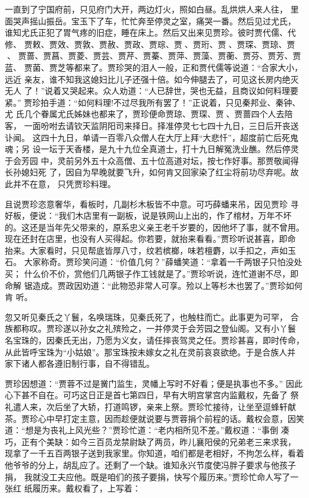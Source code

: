 一直到了宁国府前，只见府门大开，两边灯火，照如白昼。乱烘烘人来人往，
里面哭声摇山振岳。宝玉下了车，忙忙奔至停灵之室，痛哭一番。然后见过尤氏，
谁知尤氏正犯了胃气疼的旧症，睡在床上。然后又出来见贾珍。彼时贾代儒、代修、
贾敕、贾效、贾敦、贾赦、贾政、贾琮、贾、贾珩、贾、贾琛、贾琼、贾、
贾蔷、贾菖、贾菱、贾芸、贾芹、贾蓁、贾萍、贾藻、贾蘅、贾芬、贾芳、贾蓝、
贾菌、贾芝等都来了。贾珍哭的泪人一般，正和贾代儒等说道：“合家大小，远近
亲友，谁不知我这媳妇比儿子还强十倍。如今伸腿去了，可见这长房内绝灭无人
了！”说着又哭起来。众人劝道：“人已辞世，哭也无益，且商议如何料理要紧。”
贾珍拍手道：“如何料理!不过尽我所有罢了！”正说着，只见秦邦业、秦钟、尤
氏几个眷属尤氏姊妹也都来了，贾珍便命贾琼、贾琛、贾、贾蔷四个人去陪客，
一面吩咐去请钦天监阴阳司来择日。择准停灵七七四十九日，三日后开丧送讣闻。
这四十九日，单请一百零八众僧人在大厅上拜“大悲忏”，超度前亡后死鬼魂；另
设一坛于天香楼，是九十九位全真道士，打十九日解冤洗业醮。然后停灵于会芳园
中，灵前另外五十众高僧、五十位高道对坛，按七作好事。那贾敬闻得长孙媳妇死
了，因自为早晚就要飞升，如何肯又回家染了红尘将前功尽弃呢。故此并不在意，
只凭贾珍料理。

且说贾珍恣意奢华，看板时，几副杉木板皆不中意。可巧薛蟠来吊，因见贾珍
寻好板，便说：“我们木店里有一副板，说是铁网山上出的，作了棺材，万年不坏
的。这还是当年先父带来的，原系忠义亲王老千岁要的，因他坏了事，就不曾用。
现在还封在店里，也没有人买得起。你若要，就抬来看看。”贾珍听说甚喜，即命
抬来。大家看时，只见帮底皆厚八寸，纹若槟榔，味若檀麝，以手扣之，声如玉石。
大家称奇。贾珍笑问道：“价值几何？”薛蟠笑道：“拿着一千两银子只怕没处买；
什么价不价，赏他们几两银子作工钱就是了。”贾珍听说，连忙道谢不尽，即命解
锯造成。贾政因劝道：“此物恐非常人可享。殓以上等杉木也罢了。”贾珍如何肯
听。

忽又听见秦氏之丫鬟，名唤瑞珠，见秦氏死了，也触柱而亡。此事更为可罕，
合族都称叹。贾珍遂以孙女之礼殡殓之，一并停灵于会芳园之登仙阁。又有小丫鬟
名宝珠的，因秦氏无出，乃愿为义女，请任摔丧驾灵之任。贾珍甚喜，即时传命，
从此皆呼宝珠为“小姑娘”。那宝珠按未嫁女之礼在灵前哀哀欲绝。于是合族人并
家下诸人都各遵旧制行事，自不得错乱。

贾珍因想道：“贾蓉不过是黉门监生，灵幡上写时不好看；便是执事也不多。”
因此心下甚不自在。可巧这日正是首七第四日，早有大明宫掌宫内监戴权，先备了
祭礼遣人来，次后坐了大轿，打道鸣锣，亲来上祭。贾珍忙接待，让坐至逗蜂轩献
茶。贾珍心中早打定主意，因而趁便就说要与贾蓉捐个前程的话。戴权会意，因笑
道：“想是为丧礼上风光些？”贾珍忙道：“老内相所见不差。”戴权道：“事倒
凑巧，正有个美缺：如今三百员龙禁尉缺了两员，昨儿襄阳侯的兄弟老三来求我，
现拿了一千五百两银子送到我家里。你知道，咱们都是老相好，不拘怎么样，看着
他爷爷的分上，胡乱应了。还剩了一个缺。谁知永兴节度使冯胖子要求与他孩子捐，
我就没工夫应他。既是咱们的孩子要捐，快写个履历来。”贾珍忙命人写了一张红
纸履历来。戴权看了，上写着：

